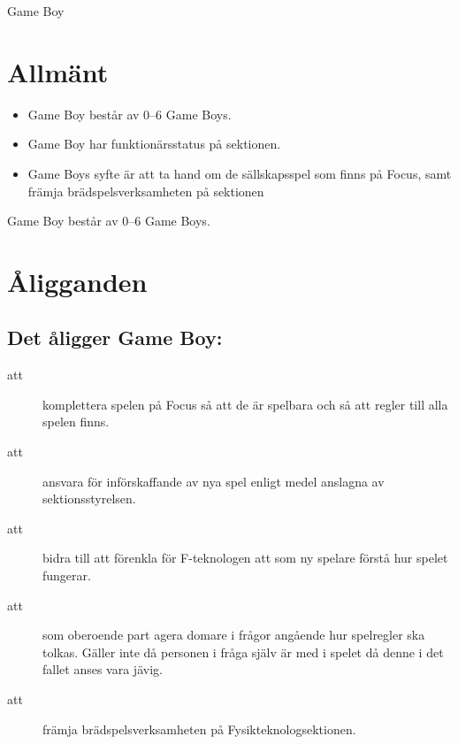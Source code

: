 \documentclass[a4paper]{article}
\begin{document}
\renewcommand{\forening}{Game Boy} %

\begin{foreningenv}{\forening{}} %
    \section{Allmänt}
    \begin{itemize}
        \item Game Boy består av 0--6 Game Boys.
        \item Game Boy har funktionärsstatus på sektionen.
        \item Game Boys syfte är att ta hand om de sällskapsspel som finns på Focus, samt främja brädspelsverksamheten på sektionen
    \end{itemize}
    Game Boy består av 0--6 Game Boys.
    
    \section{Åligganden}
    \aliggsektfunkt{}
    
    \subsection{Det åligger Game Boy:}
    \begin{description}
        \item[att] komplettera spelen på Focus så att de är spelbara och så att regler till alla spelen finns.
        \item[att] ansvara för införskaffande av nya spel enligt medel anslagna av sektionsstyrelsen.
        \item[att] bidra till att förenkla för F-teknologen att som ny spelare förstå hur spelet fungerar.
        \item[att] som oberoende part agera domare i frågor angående hur spelregler ska tolkas. Gäller inte då personen i fråga själv är med i spelet då denne i det fallet anses vara jävig.
        \item[att] främja brädspelsverksamheten på Fysikteknologsektionen.
    \end{description}
\end{foreningenv}
\end{document}
